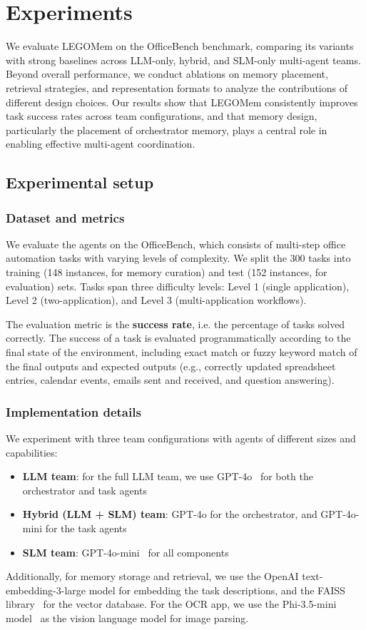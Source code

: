 \documentclass[sigconf]{aamas}
\newcommand{\legomem}{LEGOMem}
\begin{document}
\section{Experiments}
We evaluate \legomem{} on the OfficeBench benchmark, comparing its variants with strong baselines across LLM-only, hybrid, and SLM-only multi-agent teams. Beyond overall performance, we conduct ablations on memory placement, retrieval strategies, and representation formats to analyze the contributions of different design choices. Our results show that \legomem{} consistently improves task success rates across team configurations, and that memory design, particularly the placement of orchestrator memory, plays a central role in enabling effective multi-agent coordination.

\subsection{Experimental setup}
\subsubsection{Dataset and metrics}
We evaluate the agents on the OfficeBench, which consists of multi-step office automation tasks with varying levels of complexity. We split the 300 tasks into training (148 instances, for memory curation) and test (152 instances, for evaluation) sets. Tasks span three difficulty levels: Level 1 (single application), Level 2 (two-application), and Level 3 (multi-application workflows). 

The evaluation metric is the \textbf{success rate}, i.e. the percentage of tasks solved correctly. The success of a task is evaluated programmatically according to the final state of the environment, including exact match or fuzzy keyword match of the final outputs and expected outputs (e.g., correctly updated spreadsheet entries, calendar events, emails sent and received, and question answering).

\subsubsection{Implementation details}
We experiment with three team configurations with agents of different sizes and capabilities:
\begin{itemize}
    \item \textbf{LLM team}: for the full LLM team, we use GPT-4o~\cite{hurst2024gpt} for both the orchestrator and task agents
    \item \textbf{Hybrid (LLM + SLM) team}: GPT-4o for the orchestrator, and GPT-4o-mini for the task agents
    \item \textbf{SLM team}: GPT-4o-mini~\cite{hurst2024gpt} for all components
\end{itemize}
Additionally, for memory storage and retrieval, we use the OpenAI text-embedding-3-large model for embedding the task descriptions, and the FAISS library~\cite{douze2024faiss} for the vector database. For the OCR app, we use the Phi-3.5-mini model~\cite{abdin2024phi} as the vision language model for image parsing.
\end{document}
